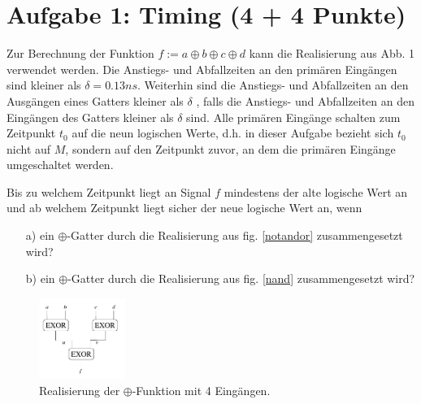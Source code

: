 \documentclass{scrartcl}[9pt, a4paper]
\begin{document}
\section*{Aufgabe 1: Timing (4 + 4 Punkte)}

Zur Berechnung der Funktion $f := a \oplus b \oplus c \oplus d$ kann die Realisierung aus Abb. 1 verwendet werden. Die Anstiegs- und Abfallzeiten an den primären Eingängen sind kleiner als $\delta = 0.13 ns$. Weiterhin sind die Anstiegs- und Abfallzeiten an den Ausgängen eines Gatters kleiner als $\delta$ , falls die Anstiegs- und Abfallzeiten an den Eingängen des Gatters kleiner als $\delta$ sind. Alle primären Eingänge schalten zum Zeitpunkt $t_0$ auf die neun logischen Werte, d.h. in dieser Aufgabe bezieht sich $t_0$ nicht auf $M$, sondern auf den Zeitpunkt zuvor, an dem die primären Eingänge umgeschaltet werden.


Bis zu welchem Zeitpunkt liegt an Signal $f$ mindestens der alte logische Wert an und ab welchem Zeitpunkt liegt sicher der neue logische Wert an, wenn

\begin{itemize}
	\item[a)] ein $\oplus$-Gatter durch die Realisierung aus fig. \ref{notandor} zusammengesetzt wird?
	\item[b)] ein $\oplus$-Gatter durch die Realisierung aus fig. \ref{nand} zusammengesetzt wird?
\end{itemize}

\begin{figure}[h]
	\centering
	\includegraphics[width=0.25\textwidth]{figs/xor1}
	\caption{Realisierung der $\oplus$-Funktion mit 4 Eingängen.}
	\label{oplus4}
\end{figure}
\end{document}
